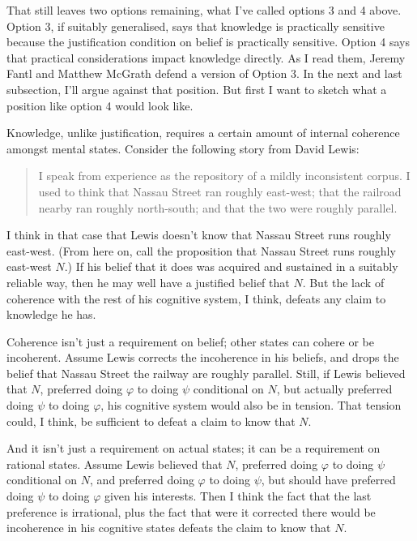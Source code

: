 That still leaves two options remaining, what I've called options 3 and 4 above. Option 3, if suitably generalised, says that knowledge is practically sensitive because the justification condition on belief is practically sensitive. Option 4 says that practical considerations impact knowledge directly. As I read them, Jeremy Fantl and Matthew McGrath defend a version of Option 3. In the next and last subsection, I'll argue against that position. But first I want to sketch what a position like option 4 would look like. 

Knowledge, unlike justification, requires a certain amount of internal coherence amongst mental states. Consider the following story from David Lewis:

\begin{quote}
I speak from experience as the repository of a mildly inconsistent corpus. I used to think that Nassau Street ran roughly east-west; that the railroad nearby ran roughly north-south; and that the two were roughly parallel. \citep[436]{Lewis1982c} 
\end{quote}

\noindent I think in that case that Lewis doesn't know that Nassau Street runs roughly east-west. (From here on, call the proposition that Nassau Street runs roughly east-west $N$.) If his belief that it does was acquired and sustained in a suitably reliable way, then he may well have a justified belief that $N$. But the lack of coherence with the rest of his cognitive system, I think, defeats any claim to knowledge he has.

Coherence isn't just a requirement on belief; other states can cohere or be incoherent. Assume Lewis corrects the incoherence in his beliefs, and drops the belief that Nassau Street the railway are roughly parallel. Still, if Lewis believed that $N$, preferred doing $\varphi$ to doing $\psi$ conditional on $N$, but actually preferred doing $\psi$ to doing $\varphi$, his cognitive system would also be in tension. That tension could, I think, be sufficient to defeat a claim to know that $N$.

And it isn't just a requirement on actual states; it can be a requirement on rational states. Assume Lewis believed that $N$, preferred doing $\varphi$ to doing $\psi$ conditional on $N$, and preferred doing $\varphi$ to doing $\psi$, but should have preferred doing $\psi$ to doing $\varphi$ given his interests. Then I think the fact that the last preference is irrational, plus the fact that were it corrected there would be incoherence in his cognitive states defeats the claim to know that $N$.

